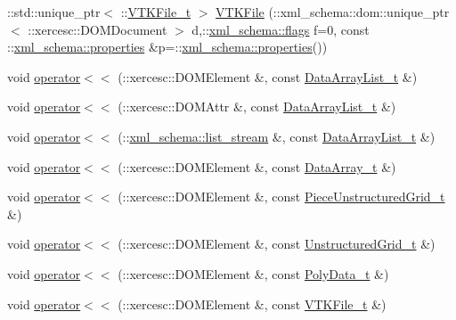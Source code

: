 \begin{DoxyCompactItemize}
\item 
\+::std\+::unique\+\_\+ptr$<$ \+::\hyperlink{classVTKFile__t}{V\+T\+K\+File\+\_\+t} $>$ \hyperlink{vtk-unstructured_8h_ae301111feb89642b4dc1edc42b4cd5d5}{V\+T\+K\+File} (\+::xml\+\_\+schema\+::dom\+::unique\+\_\+ptr$<$ \+::xercesc\+::\+D\+O\+M\+Document $>$ d,\+::\hyperlink{namespacexml__schema_a0612287d030cb2732d31a45b258fdc87}{xml\+\_\+schema\+::flags} f=0, const \+::\hyperlink{namespacexml__schema_a1a8ebac679580b41baebd62c7d641c1d}{xml\+\_\+schema\+::properties} \&p=\+::\hyperlink{namespacexml__schema_a1a8ebac679580b41baebd62c7d641c1d}{xml\+\_\+schema\+::properties}())
\item 
void \hyperlink{vtk-unstructured_8h_a2721bf53923d5c5970c933ae5921f4dc}{operator$<$$<$} (\+::xercesc\+::\+D\+O\+M\+Element \&, const \hyperlink{classDataArrayList__t}{Data\+Array\+List\+\_\+t} \&)
\item 
void \hyperlink{vtk-unstructured_8h_a24556fd48a78f322cb82d7bcdc9c4ab9}{operator$<$$<$} (\+::xercesc\+::\+D\+O\+M\+Attr \&, const \hyperlink{classDataArrayList__t}{Data\+Array\+List\+\_\+t} \&)
\item 
void \hyperlink{vtk-unstructured_8h_a50f994a7e4e7766ad192e07d443a14e5}{operator$<$$<$} (\+::\hyperlink{namespacexml__schema_a840728106ddd08800e62729d4eddbbc8}{xml\+\_\+schema\+::list\+\_\+stream} \&, const \hyperlink{classDataArrayList__t}{Data\+Array\+List\+\_\+t} \&)
\item 
void \hyperlink{vtk-unstructured_8h_a1ef510bc9917a229ea37ca7045a47099}{operator$<$$<$} (\+::xercesc\+::\+D\+O\+M\+Element \&, const \hyperlink{classDataArray__t}{Data\+Array\+\_\+t} \&)
\item 
void \hyperlink{vtk-unstructured_8h_a126131a4ada1026f6eb13998253e4800}{operator$<$$<$} (\+::xercesc\+::\+D\+O\+M\+Element \&, const \hyperlink{classPieceUnstructuredGrid__t}{Piece\+Unstructured\+Grid\+\_\+t} \&)
\item 
void \hyperlink{vtk-unstructured_8h_a4f19051c77ec836cb7beb9b68906631c}{operator$<$$<$} (\+::xercesc\+::\+D\+O\+M\+Element \&, const \hyperlink{classUnstructuredGrid__t}{Unstructured\+Grid\+\_\+t} \&)
\item 
void \hyperlink{vtk-unstructured_8h_a3c9c02d91057a8a29257177e90534c59}{operator$<$$<$} (\+::xercesc\+::\+D\+O\+M\+Element \&, const \hyperlink{classPolyData__t}{Poly\+Data\+\_\+t} \&)
\item 
void \hyperlink{vtk-unstructured_8h_a845f3985ea7fa7ecc6e7c7d77d1f8050}{operator$<$$<$} (\+::xercesc\+::\+D\+O\+M\+Element \&, const \hyperlink{classVTKFile__t}{V\+T\+K\+File\+\_\+t} \&)

\end{DoxyCompactItemize}
